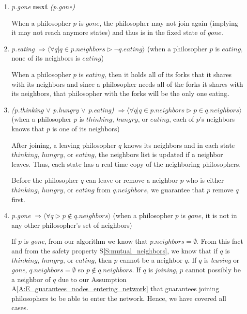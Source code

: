 \documentclass[11pt]{article}
\begin{document}
\begin{enumerate}[S1]
\item {\it p.gone} {\bfseries next} {\it (p.gone)}

When a philosopher $p$ is $gone$, the philosopher may not join again (implying it may not reach anymore states) and thus is in the fixed state of $gone$.

\item {\it p.eating} $\Rightarrow \langle \forall q | q \in p.neighbors \rhd \neg q.eating \rangle$
(when a philosopher $p$ is $eating$, none of its neighbors is $eating$)

When a philosopher $p$ is $eating$, then it holds all of its forks that it shares with its neighbors and since a philosopher needs all of the forks it shares with its neighbors, that philosopher with the forks will be the only one eating.


\item \label{S:mutual_neighbors} {\it (p.thinking $\vee$ p.hungry $\vee$ p.eating)} $\Rightarrow \langle \forall q | q \in p.neighbors \rhd p \in q.neighbors \rangle$
(when a philosopher $p$ is $thinking$, $hungry$, or $eating$, each of $p$'s neighbors knows that $p$ is one of its neighbors)

After joining, a leaving philosopher $q$ knows its neighbors and in each state $thinking$, $hungry$, or $eating$, the neighbors list is updated if a neighbor leaves. Thus, each state has a real-time copy of the neighboring philosophers.

Before the philosopher $q$ can leave or remove a neighbor $p$ who is either $thinking$, $hungry$, or $eating$ from $q.neighbors$, we guarantee that $p$ remove $q$ first.

\item {\it p.gone} $\Rightarrow \langle \forall q  \rhd p\not\in q.neighbors \rangle$
(when a philosopher $p$ is $gone$, it is not in any other philosopher's set of neighbors)

If $p$ is \emph{gone}, from our algorithm we know that $p.neighbors = \emptyset$. From this fact and from the safety property S\ref{S:mutual_neighbors}, we know that if $q$ is $thinking$, $hungry$, or $eating$, then $p$ cannot be a neighbor $q$. If $q$ is \emph{leaving} or \emph{gone}, $q.neighbors = \emptyset$ so $p\not\in q.neighbors.$ If $q$ is \emph{joining}, $p$ cannot possibly be a neighbor of $q$ due to our Assumption A\ref{A:E_guarantees_nodes_entering_network} that guarantees joining philosophers to be able to enter the network. Hence, we have covered all cases.

\end{enumerate}
\end{document}
